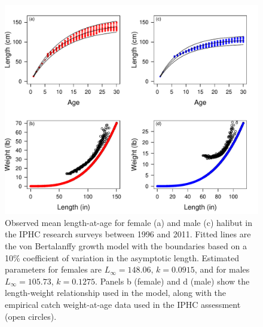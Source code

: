 \begin{figure}[htbp]
	\centering
		\includegraphics[width=\textwidth]{../FIGURES/figLengthAtAgeFit.pdf}
	\caption{Observed mean length-at-age for female (a) and male (c) halibut in the IPHC research surveys between 1996 and 2011. Fitted lines are the von Bertalanffy growth model with the boundaries based on a 10\% coefficient of variation in the asymptotic length. Estimated parameters for females are $L_\infty=148.06$, $k=0.0915$, and for males $L_\infty=105.73$, $k=0.1275$. Panels b  (female) and d (male) show the length-weight relationship used in the model, along with the empirical catch weight-at-age data used in the IPHC assessment (open circles).}
	\label{fig:FIGURES_figLengthAtAgeFit}
\end{figure}



